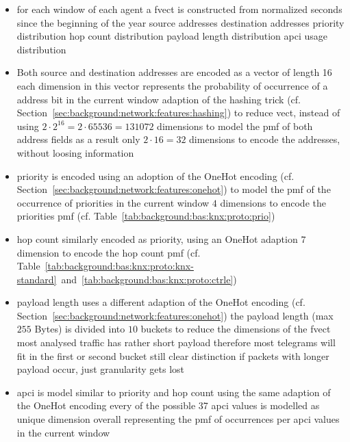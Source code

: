 \begin{itemize}
	\item for each window of each agent a \gls{fvect} is constructed from
		\subitem normalized seconds since the beginning of the year
		\subitem source addresses
		\subitem destination addresses
		\subitem priority distribution
		\subitem hop count distribution
		\subitem payload length distribution
		\subitem \gls{apci} usage distribution
	\item Both source and destination addresses are encoded as a vector of length 16
		\subitem each dimension in this vector represents the probability of occurrence of a address bit in the current window
		\subitem adaption of the hashing trick (cf. Section~\ref{sec:background:network:features:hashing})
		\subitem to reduce \gls{vect}, instead of using $2 \cdot 2^16 = 2 \cdot 65536 = 131072$ dimensions to model the \gls{pmf} of both address fields
		\subitem as a result only $2 \cdot 16 = 32$ dimensions to encode the addresses, without loosing information
	\item priority is encoded using an adoption of the OneHot encoding (cf. Section~\ref{sec:background:network:features:onehot}) to model the \gls{pmf} of the occurrence of priorities in the current window
		\subitem $4$ dimensions to encode the priorities \gls{pmf} (cf. Table~\ref{tab:background:bas:knx:proto:prio})
	\item hop count similarly encoded as priority, using an OneHot adaption
		\subitem $7$ dimension to encode the hop count \gls{pmf} (cf. Table~\ref{tab:background:bas:knx:proto:knx-standard}~and~\ref{tab:background:bas:knx:proto:ctrle})
	\item payload length uses a different adaption of the OneHot encoding (cf. Section~\ref{sec:background:network:features:onehot})
		\subitem the payload length (max $255$ Bytes) is divided into $10$ buckets to reduce the dimensions of the \gls{fvect}
		\subitem most analysed traffic has rather short payload
		\subitem therefore most telegrams will fit in the first or second bucket
		\subitem still clear distinction if packets with longer payload occur, just granularity gets lost
	\item \gls{apci} is model similar to priority and hop count using the same adaption of the OneHot encoding
		\subitem every of the possible \alert{37}  \gls{apci} values is modelled as unique dimension
		\subitem overall representing the \gls{pmf} of occurrences per \gls{apci} values in the current window
		

\end{itemize}
